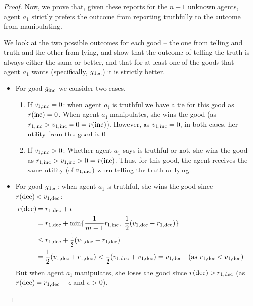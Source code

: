 \begin{proof}
Now, we prove that, given these reports for the $n-1$ unknown agents, agent $a_1$ strictly prefers the outcome from reporting truthfully to the outcome from manipulating.

    We look at the two possible outcomes for each good -- the one from telling and truth and the other from lying, and show that the outcome of telling the truth is always either the same or better, and that for at least one of the goods that agent $a_1$ wants (specifically, $g_{\mathrm{dec}}$) it is strictly better.

    \begin{itemize}
        \item For good $g_{\mathrm{inc}}$ we consider two cases.
        \begin{enumerate}
            \item If $v_{1,\mathrm{inc}} = 0$: when agent $a_1$ is truthful we have a tie for this good as $r(\mathrm{inc}) = 0$.
            When agent $a_1$ manipulates, she wins the good (as $r_{1,\mathrm{inc}} > v_{1,\mathrm{inc}} = 0 = r(\mathrm{inc})$).
            However, as $v_{1,\mathrm{inc}} = 0$, in both cases, her utility from this good is $0$.

            \item If $v_{1,\mathrm{inc}} > 0$:
            Whether agent $a_1$ says is truthful or not, she wins the good as $r_{1,\mathrm{inc}} > v_{1,\mathrm{inc}} > 0 =r(\mathrm{inc})$.
            Thus, for this good, the agent receives the same utility (of $v_{1,\mathrm{inc}}$) when telling the truth or lying.

        \end{enumerate}
        
        
        \item For good $g_{\mathrm{dec}}$: when agent $a_1$ is truthful, she wins the good since $r(\mathrm{dec}) < v_{1,\mathrm{dec}}$:
        \begin{align*}
            r(\mathrm{dec}) &= r_{1,\mathrm{dec}} + \epsilon \\
            &= r_{1,\mathrm{dec}} + \min \{\frac{1}{m-1}r_{1,\mathrm{inc}},~ \frac{1}{2}(v_{1,\mathrm{dec}} - r_{1,\mathrm{dec}})\}\\
            &\leq r_{1,\mathrm{dec}} +  \frac{1}{2}(v_{1,\mathrm{dec}} - r_{1,\mathrm{dec}}) \\
            &= \frac{1}{2}(v_{1,\mathrm{dec}} + r_{1,\mathrm{dec}})< \frac{1}{2}(v_{1,\mathrm{dec}} + v_{1,\mathrm{dec}}) = v_{1,\mathrm{dec}} && \text{(as $r_{1,\mathrm{dec}} < v_{1,\mathrm{dec}}$)}
        \end{align*}
        But when agent $a_1$ manipulates, she loses the good since $r(\mathrm{dec}) > r_{1,\mathrm{dec}}$ (as $r(\mathrm{dec}) = r_{1,\mathrm{dec}} + \epsilon$ and $\epsilon > 0$).
        

\end{itemize}
\end{proof}
